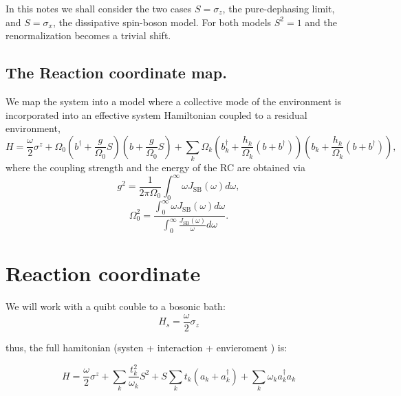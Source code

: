 \documentclass[%
preprint,
onecolumn,
notitlepag,
 amsmath,amssymb,
 aps,
 pra,
]{revtex4-2}
\begin{document}
In this notes we shall consider the two cases $S = \sigma_{z}$, the pure-dephasing limit, and $S = \sigma_{x}$, the dissipative spin-boson model. For both models $S^2 =1$ and the renormalization becomes a trivial shift.

\subsection{The Reaction coordinate map.}

We map the system  into a model where a collective mode of the environment is incorporated into an effective system Hamiltonian coupled to a residual environment,
\begin{equation}
H=\frac{\omega}{2} \sigma^{z}+\Omega_{0}\left(b^{\dagger}+\frac{g}{\Omega_{0}} S\right)\left(b+\frac{g}{\Omega_{0}} S\right)+\sum_{k} \Omega_{k}\left(b_{k}^{\dagger}+\frac{h_{k}}{\Omega_{k}}\left(b+b^{\dagger}\right)\right)\left(b_{k}+\frac{h_{k}}{\Omega_{k}}\left(b+b^{\dagger}\right)\right),
\end{equation}
where the coupling strength and the energy of the RC are obtained via
\begin{equation}
g^{2}=\frac{1}{2 \pi \Omega_{0}} \int_{0}^{\infty} \omega J_{\text{SB}}(\omega) d \omega,
\end{equation}
\begin{equation}
\Omega_{0}^{2}=\frac{\int_{0}^{\infty} \omega J_{\text{SB}}(\omega) d \omega}{\int_{0}^{\infty} \frac{J_{\text{SB}}(\omega)}{\omega} d \omega}.
\end{equation} 
 
\appendix
\section{Reaction coordinate}
We will work with a quibt couble to a bosonic bath:
\begin{equation}
 H_s= \frac{\omega}{2} \sigma_z    
\end{equation}
 
 thus, the full hamitonian (systen + interaction + envieroment ) is:



\begin{equation}
H=\frac{\omega}{2} \sigma^{z}+\sum_{k} \frac{t_{k}^{2}}{\omega_{k}} S^{2}+S \sum_{k} t_{k}\left(a_{k}+a_{k}^{\dagger}\right)+\sum_{k} \omega_{k} a_{k}^{\dagger} a_{k}
\end{equation}
\end{document}

